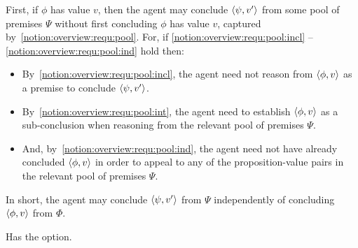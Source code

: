 \begin{note}
  First, if \(\phi\) has value \(v\), then the agent may conclude \(\langle \psi, v' \rangle\) from some pool of premises \(\Psi\) without first concluding \(\phi\) has value \(v\), captured by~\ref{notion:overview:requ:pool}.
  For, if \ref{notion:overview:requ:pool:incl} -- \ref{notion:overview:requ:pool:ind} hold then:
  \begin{itemize}
  \item
    By~\ref{notion:overview:requ:pool:incl}, the agent need not reason from \(\langle \phi, v \rangle\) as a premise to conclude \(\langle \psi, v' \rangle\).
  \item
    By~\ref{notion:overview:requ:pool:int}, the agent need to establish \(\langle \phi, v \rangle\) as a sub-conclusion when reasoning from the relevant pool of premises \(\Psi\).
  \item
    And, by~\ref{notion:overview:requ:pool:ind}, the agent need not have already concluded \(\langle \phi, v \rangle\) in order to appeal to any of the proposition-value pairs in the relevant pool of premises \(\Psi\).
  \end{itemize}
  In short, the agent may conclude \(\langle \psi, v' \rangle\) from \(\Psi\) independently of concluding \(\langle \phi, v \rangle\) from \(\Phi\).
\end{note}

\begin{note}
  \color{red}
  Has the option.
\end{note}

